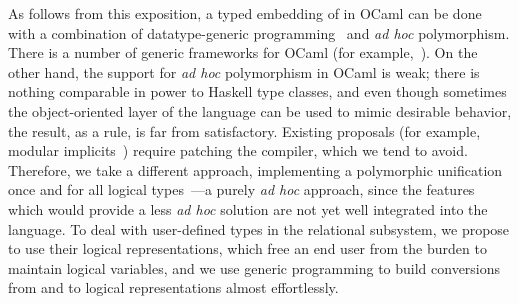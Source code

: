 As follows from this exposition, a typed embedding of \miniKanren in OCaml can be done with
a combination of datatype-generic programming~\cite{DGP} and \emph{ad hoc} polymorphism. There is a
number of generic frameworks for OCaml (for example,~\cite{Deriving}). On the other hand, the support
for \emph{ad hoc} polymorphism in OCaml is weak; there is nothing comparable in power to Haskell
type classes, and even though sometimes the object-oriented layer of the language can be used to mimic
desirable behavior, the result, as a rule, is far from satisfactory. Existing proposals (for example,
modular implicits~\cite{Implicits}) require patching the compiler, which we tend to avoid. Therefore, we 
take a different approach, implementing a polymorphic unification once and for all logical types~---a purely \emph{ad hoc} 
approach, since the features which would provide a less \emph{ad hoc} solution are not yet well integrated into the language. To deal
with user-defined types in the relational subsystem, we propose to use their logical representations, which free an end user
from the burden to maintain logical variables, and we use generic programming to build conversions from and to logical
representations almost effortlessly.



